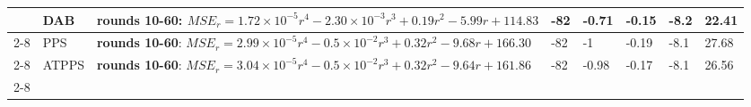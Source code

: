 \begin{table}[]
\begin{adjustbox}
\begin{tabular}{|p{1cm}|p{1.1cm}|p{10cm}|p{1.2cm}|p{1.2cm}|p{1.2cm}|p{1cm}|p{1cm}|}
\multicolumn{1}{|l|}{} & DAB & \textbf{rounds 10-60}: $MSE_r=1.72\times 10^{-5}r^{4}-2.30\times 10^{-3}r^{3}+ 0.19r^{2}-5.99r+114.83$ & -82& -0.71 &-0.15 & -8.2  & 22.41 \\ \cline{2-8} 
\multicolumn{1}{|l|}{} & PPS & \textbf{rounds 10-60}: $MSE_r= 2.99\times 10^{-5}r^{4}-0.5\times 10^{-2}r^{3} + 0.32r^{2} -9.68r + 166.30$ & -82 & -1 & -0.19 & -8.1 & 27.68 \\ \cline{2-8} 
\multicolumn{1}{|l|}{} & ATPPS & \textbf{rounds 10-60}: $MSE_r=3.04\times 10^{-5}r^{4}-0.5\times 10^{-2}r^{3} + 0.32r^{2}-9.64r+161.86$ & -82 & -0.98 & -0.17 & -8.1 & 26.56\\ \cline{2-8}
\hline
\end{tabular}
\end{adjustbox}
\end{table}